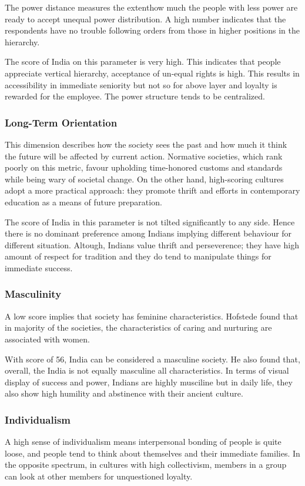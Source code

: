 \documentclass{article}
\begin{document}
The power distance measures the extenthow much the people with less power are ready to accept unequal power distribution. A high number indicates that the respondents have no trouble following orders from those in higher positions in the hierarchy.

The score of India on this parameter is very high. This indicates that people appreciate vertical hierarchy, acceptance of un-equal rights is high. This results in accessibility in immediate seniority but not so for above layer and loyalty is rewarded for the employee. The power structure tends to be centralized.

\subsubsection{Long-Term Orientation}

This dimension describes how the society sees the past and how much it think the future will be affected by current action. Normative societies, which rank poorly on this metric, favour upholding time-honored customs and standards while being wary of societal change. On the other hand, high-scoring cultures adopt a more practical approach: they promote thrift and efforts in contemporary education as a means of future preparation.

The score of India in this parameter is not tilted significantly to any side. Hence there is no dominant preference among Indians implying different  behaviour for different situation. Altough, Indians  value thrift and perseverence; they have high amount of respect for tradition and they do tend to manipulate things for immediate success.

\subsubsection{Masculinity}

A low score implies that society has feminine characteristics. Hofstede found that in majority of the societies, the characteristics of caring and nurturing are associated with women.

With score of 56, India can be considered a masculine society. He also found that, overall, the India is not equally masculine all characteristics. In terms of visual display of success and power, Indians are highly musciline but in daily life, they also show high humility and abstinence with their ancient culture.

\subsubsection{Individualism}
A high sense of individualism means interpersonal bonding of people is quite loose, and people tend to think about themselves and their immediate families. In the opposite spectrum, in cultures with high collectivism, members in a group can look at other members for unquestioned loyalty.
\end{document}
